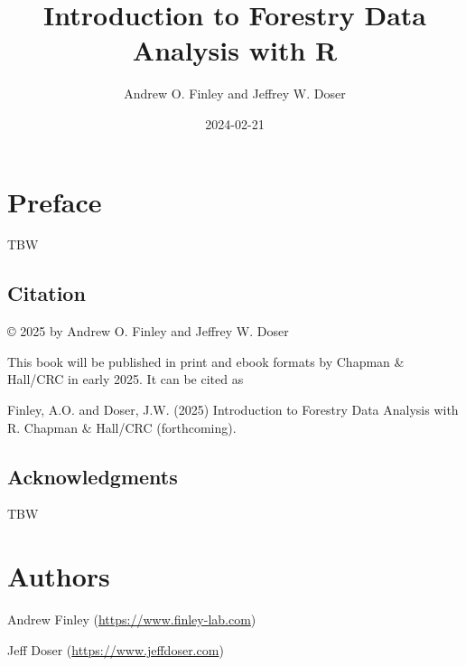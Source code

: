 \documentclass[
  11pt,
]{krantz}
\title{Introduction to Forestry Data Analysis with R}
\author{Andrew O. Finley and Jeffrey W. Doser}
\date{2024-02-21}
\theoremstyle{definition}
\theoremstyle{definition}
\theoremstyle{definition}
\theoremstyle{definition}
\theoremstyle{remark}
\begin{document}
\maketitle

\thispagestyle{empty}

\setlength{\abovedisplayskip}{3pt}
\setlength{\belowdisplayskip}{3pt}
\setlength{\abovedisplayshortskip}{2pt}
\setlength{\belowdisplayshortskip}{2pt}

{
\hypersetup{linkcolor=}
\setcounter{tocdepth}{2}
\tableofcontents
}
\listoftables
\listoffigures
\hypertarget{preface}{%
\chapter*{Preface}\label{preface}}


TBW

\hypertarget{citation}{%
\section*{Citation}\label{citation}}


© 2025 by Andrew O. Finley and Jeffrey W. Doser

This book will be published in print and ebook formats by Chapman \& Hall/CRC in early 2025. It can be cited as

Finley, A.O. and Doser, J.W. (2025) Introduction to Forestry Data Analysis with R. Chapman \& Hall/CRC (forthcoming).

\hypertarget{acknowledgments}{%
\section*{Acknowledgments}\label{acknowledgments}}


TBW

\hypertarget{authors}{%
\chapter*{Authors}\label{authors}}


Andrew Finley (\url{https://www.finley-lab.com})

Jeff Doser (\url{https://www.jeffdoser.com})

\mainmatter
\end{document}
